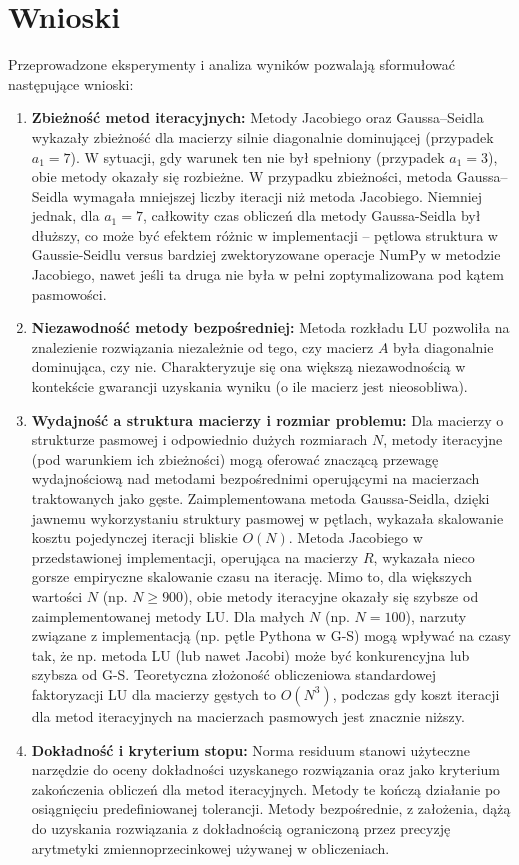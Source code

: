 \documentclass[a4paper, 11pt]{article}
\begin{document}
\section{Wnioski}
Przeprowadzone eksperymenty i analiza wyników pozwalają sformułować następujące wnioski:
\begin{enumerate}
    \item \textbf{Zbieżność metod iteracyjnych:} Metody Jacobiego oraz Gaussa–Seidla wykazały zbieżność dla macierzy silnie diagonalnie dominującej (przypadek $a_1=7$). W sytuacji, gdy warunek ten nie był spełniony (przypadek $a_1=3$), obie metody okazały się rozbieżne. W przypadku zbieżności, metoda Gaussa–Seidla wymagała mniejszej liczby iteracji niż metoda Jacobiego. Niemniej jednak, dla $a_1=7$, całkowity czas obliczeń dla metody Gaussa-Seidla był dłuższy, co może być efektem różnic w implementacji – pętlowa struktura w Gaussie-Seidlu versus bardziej zwektoryzowane operacje NumPy w metodzie Jacobiego, nawet jeśli ta druga nie była w pełni zoptymalizowana pod kątem pasmowości.
    \item \textbf{Niezawodność metody bezpośredniej:} Metoda rozkładu LU pozwoliła na znalezienie rozwiązania niezależnie od tego, czy macierz $A$ była diagonalnie dominująca, czy nie. Charakteryzuje się ona większą niezawodnością w kontekście gwarancji uzyskania wyniku (o ile macierz jest nieosobliwa).
    \item \textbf{Wydajność a struktura macierzy i rozmiar problemu:} Dla macierzy o strukturze pasmowej i odpowiednio dużych rozmiarach $N$, metody iteracyjne (pod warunkiem ich zbieżności) mogą oferować znaczącą przewagę wydajnościową nad metodami bezpośrednimi operującymi na macierzach traktowanych jako gęste. Zaimplementowana metoda Gaussa-Seidla, dzięki jawnemu wykorzystaniu struktury pasmowej w pętlach, wykazała skalowanie kosztu pojedynczej iteracji bliskie $O(N)$. Metoda Jacobiego w przedstawionej implementacji, operująca na macierzy $R$, wykazała nieco gorsze empiryczne skalowanie czasu na iterację. Mimo to, dla większych wartości $N$ (np. $N \ge 900$), obie metody iteracyjne okazały się szybsze od zaimplementowanej metody LU. Dla małych $N$ (np. $N=100$), narzuty związane z implementacją (np. pętle Pythona w G-S) mogą wpływać na czasy tak, że np. metoda LU (lub nawet Jacobi) może być konkurencyjna lub szybsza od G-S. Teoretyczna złożoność obliczeniowa standardowej faktoryzacji LU dla macierzy gęstych to $O(N^3)$, podczas gdy koszt iteracji dla metod iteracyjnych na macierzach pasmowych jest znacznie niższy.
    \item \textbf{Dokładność i kryterium stopu:} Norma residuum stanowi użyteczne narzędzie do oceny dokładności uzyskanego rozwiązania oraz jako kryterium zakończenia obliczeń dla metod iteracyjnych. Metody te kończą działanie po osiągnięciu predefiniowanej tolerancji. Metody bezpośrednie, z założenia, dążą do uzyskania rozwiązania z dokładnością ograniczoną przez precyzję arytmetyki zmiennoprzecinkowej używanej w obliczeniach.
\end{enumerate}
\end{document}
